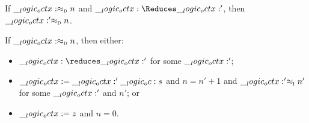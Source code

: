 \begin{theorem}[Preservation]
  If $\adec{\octx}{n}$ and $\octx \Reduces \octx'$, then $\adec{\octx'}{n}$.
\end{theorem}



\begin{theorem}[Progress]
  If $\adec{\octx}{n}$, then either:
  \begin{itemize}[nosep]
  \item $\octx \reduces \octx'$ for some $\octx'$;
  \item $\octx = \octx' \oc s$ and $n = n' + 1$ and $\ainc{\octx'}{n'}$ for some $\octx'$ and $n'$; or
  \item $\octx = z$ and $n = 0$.
  \end{itemize}
\end{theorem}






